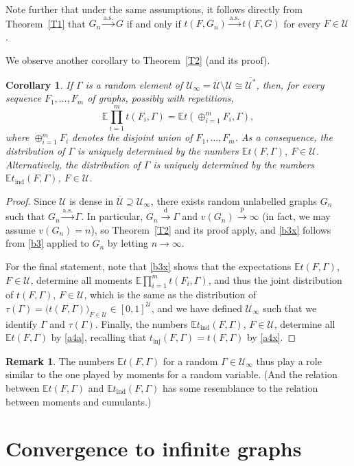 \documentclass[11pt,reqno,tbtags]{amsart}
\numberwithin{equation}{section}
\newtheorem{corollary}[theorem]{Corollary}
\theoremstyle{definition}
\newtheorem{remark}{Remark}[section]
\theoremstyle{remark}
\newcommand{\refT}[1]{Theorem~\ref{#1}}
\newcommand\bigpar[1]{\bigl(#1\bigr)}
\newcommand\lrpar[1]{\left(#1\right)}
\newcommand\ntoo{\ensuremath{{n\to\infty}}}
\newcommand{\tend}{\longrightarrow}
\newcommand\dto{\overset{\mathrm{d}}{\tend}}
\newcommand\pto{\overset{\mathrm{p}}{\tend}}
\newcommand\asto{\overset{\mathrm{a.s.}}{\tend}}
\newcommand\E{\operatorname{\mathbb E{}}}
\newcommand\gG{\Gamma}
\newcommand\cU{{\mathcal U}}
\renewcommand{\=}{:=}
\newcommand\oi{[0,1]}
\newcommand{\tinj}{t_{\mathrm{inj}}}
\newcommand{\tind}{t_{\mathrm{ind}}}
\newcommand{\cux}{\cU^*}
\newcommand{\cuxq}{\overline{\cux}}
\newcommand{\cuq}{\overline{\cU}}
\newcommand{\cuoo}{\cU_\infty}
\newcommand{\oiu}{\oi^{\cU}}
\begin{document}
Note further that under the same assumptions, 
it follows directly from \refT{T1} that
$G_n\asto G$ if and only if
$t(F,G_n)\asto t(F,G)$ for every $F\in\cU$.

We observe another corollary to \refT{T2} (and its proof).

\begin{corollary}
  \label{C2aa}
If $\gG$ is a random element of $\cuoo=\cuq\setminus\cU\cong\cuxq$,
then, for every sequence $F_1,\dots,F_m$ of graphs, possibly with
repetitions,
\begin{equation}\label{b3x}
\E\prod_{i=1}^mt(F_i,\gG)
=\E  t\lrpar{\oplus_{i=1}^mF_i,\gG},
\end{equation}
where $\oplus_{i=1}^mF_i$ denotes the disjoint union of
$F_1,\dots,F_m$. As a consequence, the distribution of $\gG$ is uniquely
determined by the numbers $\E t(F,\gG)$, $F\in\cU$.
Alternatively, 
the distribution of $\gG$ is uniquely
determined by the numbers $\E \tind(F,\gG)$, $F\in\cU$.
\end{corollary}

\begin{proof}
  Since $\cU$ is dense in $\cuq\supseteq\cuoo$, there exists random
  unlabelled graphs $G_n$ such that $G_n\asto \gG$. In particular,
$G_n\dto \gG$ and $v(G_n)\pto\infty$ (in fact, we may assume  $v(G_n)=n$),
so \refT{T2} and its proof apply, and \eqref{b3x} follows from
  \eqref{b3} applied to $G_n$ by letting \ntoo.

For the final statement, note that \eqref{b3x} shows that the
expectations $\E t(F,\gG)$, $F\in\cU$, determine all moments
$\E\prod_{i=1}^m t(F_i,\gG)$, and thus the joint distribution of
$t(F,\gG)$, $F\in\cU$, which is the same as the distribution of
$\tau(\gG)=\bigpar{t(F,\gG)}_{F\in\cU}\in\oiu$, and we have defined
$\cuoo$ such that we identify $\gG$ and $\tau(\gG)$.
Finally, the numbers $\E \tind(F,\gG)$, $F\in\cU$,
determine all $\E t(F,\gG)$ by 
\eqref{a4a}, recalling that $\tinj(F,\gG)=t(F,\gG)$ by \eqref{a4x}.
 \end{proof}

\begin{remark}
  The numbers $\E t(F,\gG)$ for a random $\gG\in\cuoo$ thus play a role
  similar to the one played by moments for a random variable.
(And the relation between $\E t(F,\gG)$ and $\E\tind(F,\gG)$ has some
  resemblance to the relation between moments and cumulants.)
\end{remark}



\section{Convergence to infinite graphs}\label{Sinfinite}
\end{document}
